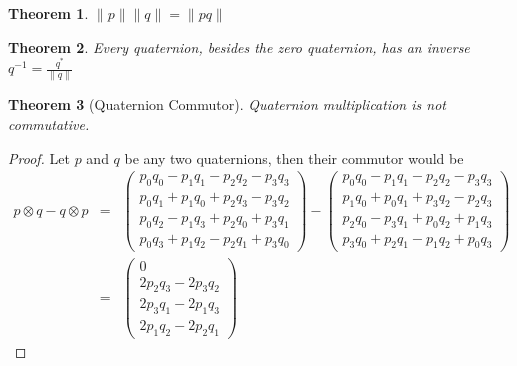 \documentclass{amsart}
\newtheorem{theorem}{Theorem}[section]
\theoremstyle{definition}
\theoremstyle{remark}
\numberwithin{equation}{section}
\begin{document}
\begin{theorem}
  $\|p\|\|q\|=\|pq\|$
\end{theorem}

\begin{theorem}
  Every quaternion, besides the zero quaternion, has an inverse $q^{-1}=\frac{q^*}{\|q\|}$
\end{theorem}

\begin{theorem}[Quaternion Commutor]
  Quaternion multiplication is not commutative.
\end{theorem}
\begin{proof}
  Let $p$ and $q$ be any two quaternions, then their commutor would be
  \begin{eqnarray}
    p\otimes q-q\otimes p &=&
    \begin{pmatrix}
      p_0q_0 - p_1q_1 - p_2q_2 - p_3q_3 \\
      p_0q_1 + p_1q_0 + p_2q_3 - p_3q_2 \\
      p_0q_2 - p_1q_3 + p_2q_0 + p_3q_1 \\
      p_0q_3 + p_1q_2 - p_2q_1 + p_3q_0
    \end{pmatrix} -
    \begin{pmatrix}
      p_0q_0 - p_1q_1 - p_2q_2 - p_3q_3 \\
      p_1q_0 + p_0q_1 + p_3q_2 - p_2q_3 \\
      p_2q_0 - p_3q_1 + p_0q_2 + p_1q_3 \\
      p_3q_0 + p_2q_1 - p_1q_2 + p_0q_3
    \end{pmatrix}\nonumber\\
    &=&
    \begin{pmatrix}
      0 \\
      2p_2q_3-2p_3q_2\\
      2p_3q_1-2p_1q_3\\
      2p_1q_2-2p_2q_1
    \end{pmatrix}
  \end{eqnarray}
\end{proof}
\end{document}
